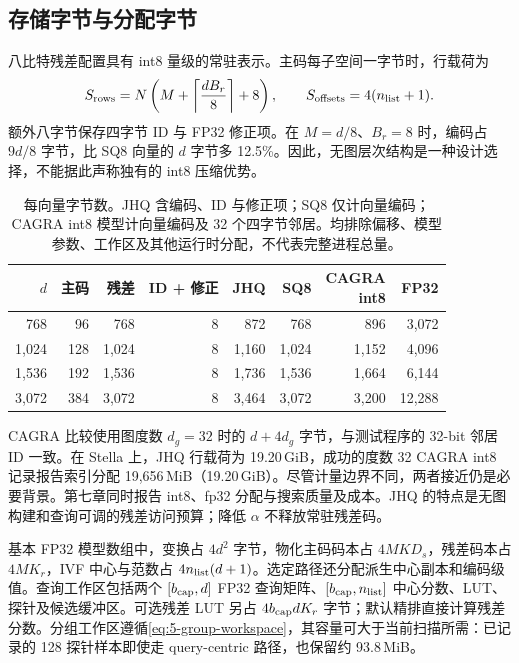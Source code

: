 \subsection{存储字节与分配字节}

八比特残差配置具有 int8 量级的常驻表示。主码每子空间一字节时，行载荷为
\begin{equation}
 S_{\rm rows}=N\left(M+\left\lceil\frac{dB_r}{8}\right\rceil+8\right),
 \qquad S_{\rm offsets}=4(n_{\rm list}+1).
 \label{eq:4-row-storage}
\end{equation}
额外八字节保存四字节 ID 与 FP32 修正项。在 $M=d/8$、$B_r=8$ 时，编码占 $9d/8$ 字节，比 SQ8 向量的 $d$ 字节多 12.5\%。因此，无图层次结构是一种设计选择，不能据此声称独有的 int8 压缩优势。

\begin{table}[tbp]
\centering
\caption[单向量存储模型]{每向量字节数。JHQ 含编码、ID 与修正项；SQ8 仅计向量编码；CAGRA int8 模型计向量编码及 32 个四字节邻居。均排除偏移、模型参数、工作区及其他运行时分配，不代表完整进程总量。}
\label{tab:4-bytes}
\footnotesize\setlength{\tabcolsep}{4pt}
\begin{tabular}{@{}rrrrrrrr@{}}
\toprule
$d$ & 主码 & 残差 & ID + 修正 & JHQ & SQ8 & \shortstack{CAGRA\\int8} & FP32 \\
\midrule
768 & 96 & 768 & 8 & 872 & 768 & 896 & 3,072 \\
1,024 & 128 & 1,024 & 8 & 1,160 & 1,024 & 1,152 & 4,096 \\
1,536 & 192 & 1,536 & 8 & 1,736 & 1,536 & 1,664 & 6,144 \\
3,072 & 384 & 3,072 & 8 & 3,464 & 3,072 & 3,200 & 12,288 \\
\bottomrule
\end{tabular}
\end{table}

CAGRA 比较使用图度数 $d_g=32$ 时的 $d+4d_g$ 字节，与测试程序的 32-bit 邻居 ID 一致。在 Stella 上，JHQ 行载荷为 19.20\,GiB，成功的度数 32 CAGRA int8 记录报告索引分配 19,656\,MiB（19.20\,GiB）。尽管计量边界不同，两者接近仍是必要背景。第七章同时报告 int8、fp32 分配与搜索质量及成本。JHQ 的特点是无图构建和查询可调的残差访问预算；降低 $\alpha$ 不释放常驻残差码。

基本 FP32 模型数组中，变换占 $4d^2$ 字节，物化主码码本占 $4MKD_s$，残差码本占 $4MK_r$，IVF 中心与范数占 $4n_{\rm list}(d+1)$。选定路径还分配派生中心副本和编码级值。查询工作区包括两个 $[b_{\rm cap},d]$ FP32 查询矩阵、$[b_{\rm cap},n_{\rm list}]$ 中心分数、LUT、探针及候选缓冲区。可选残差 LUT 另占 $4b_{\rm cap}dK_r$ 字节；默认精排直接计算残差分数。分组工作区遵循\cref{eq:5-group-workspace}，其容量可大于当前扫描所需：已记录的 128 探针样本即使走 query-centric 路径，也保留约 93.8\,MiB。

